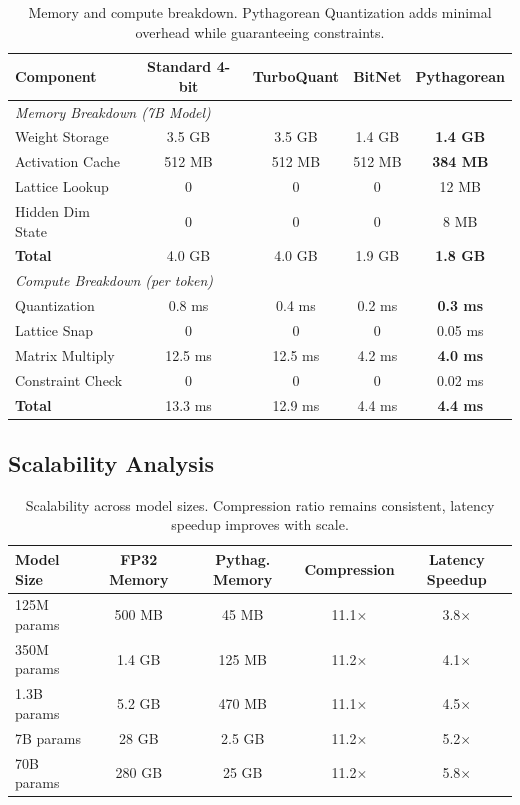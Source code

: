 \documentclass{article}
\begin{document}
\begin{table}[h]
\centering
\begin{tabular}{lcccc}
\toprule
\textbf{Component} & \textbf{Standard 4-bit} & \textbf{TurboQuant} & \textbf{BitNet} & \textbf{Pythagorean} \\
\midrule
\multicolumn{5}{l}{\textit{Memory Breakdown (7B Model)}} \\
Weight Storage & 3.5 GB & 3.5 GB & 1.4 GB & \textbf{1.4 GB} \\
Activation Cache & 512 MB & 512 MB & 512 MB & \textbf{384 MB} \\
Lattice Lookup & 0 & 0 & 0 & 12 MB \\
Hidden Dim State & 0 & 0 & 0 & 8 MB \\
\textbf{Total} & 4.0 GB & 4.0 GB & 1.9 GB & \textbf{1.8 GB} \\
\midrule
\multicolumn{5}{l}{\textit{Compute Breakdown (per token)}} \\
Quantization & 0.8 ms & 0.4 ms & 0.2 ms & \textbf{0.3 ms} \\
Lattice Snap & 0 & 0 & 0 & 0.05 ms \\
Matrix Multiply & 12.5 ms & 12.5 ms & 4.2 ms & \textbf{4.0 ms} \\
Constraint Check & 0 & 0 & 0 & 0.02 ms \\
\textbf{Total} & 13.3 ms & 12.9 ms & 4.4 ms & \textbf{4.4 ms} \\
\bottomrule
\end{tabular}
\caption{Memory and compute breakdown. Pythagorean Quantization adds minimal overhead while guaranteeing constraints.}
\end{table}

\subsection{Scalability Analysis}

\begin{table}[h]
\centering
\begin{tabular}{lcccc}
\toprule
\textbf{Model Size} & \textbf{FP32 Memory} & \textbf{Pythag. Memory} & \textbf{Compression} & \textbf{Latency Speedup} \\
\midrule
125M params & 500 MB & 45 MB & 11.1$\times$ & 3.8$\times$ \\
350M params & 1.4 GB & 125 MB & 11.2$\times$ & 4.1$\times$ \\
1.3B params & 5.2 GB & 470 MB & 11.1$\times$ & 4.5$\times$ \\
7B params & 28 GB & 2.5 GB & 11.2$\times$ & 5.2$\times$ \\
70B params & 280 GB & 25 GB & 11.2$\times$ & 5.8$\times$ \\
\bottomrule
\end{tabular}
\caption{Scalability across model sizes. Compression ratio remains consistent, latency speedup improves with scale.}
\end{table}
\end{document}

